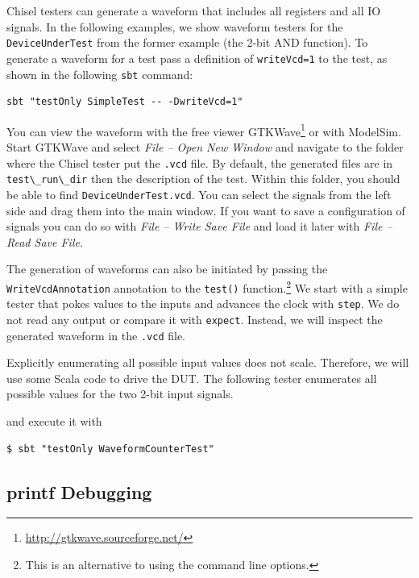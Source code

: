 \documentclass[%
    10pt,
    headinclude, footexclude,
    openright, %
    notitlepage,
    cleardoubleempty,
    headsepline,
    pointlessnumbers,
    bibtotoc, idxtotoc,
    ]{scrbook}
\newcommand{\code}[1]{{\lstinline[basicstyle=\small\ttfamily]{#1}}}
\newcommand{\myref}[2]{\href{#1}{#2}}
\renewcommand{\myref}[2]{{#2}{\footnote{\url{#1}}}}
\begin{document}
\noindent Chisel testers can generate a waveform that includes all registers and all
IO signals. In the following examples, we show waveform testers for the
\code{DeviceUnderTest} from the former example (the 2-bit AND function).
To generate a waveform for a test pass a definition of \code{writeVcd=1} to
the test, as shown in the following \code{sbt} command:

\begin{verbatim}
sbt "testOnly SimpleTest -- -DwriteVcd=1"
\end{verbatim}

You can view the waveform with the free viewer
\myref{http://gtkwave.sourceforge.net/}{GTKWave} or with ModelSim.
Start GTKWave and select \emph{File -- Open New Window} and navigate to the
folder where the Chisel tester put the \code{.vcd} file. By default, the generated files
are in \code{test\_run\_dir} then the description of the test. %
Within this folder, you should be able to find \code{DeviceUnderTest.vcd}.
You can select the signals from the left side and drag them into the main window.
If you want to save a configuration of signals you can do so with \emph{File -- Write Save File}
and load it later with \emph{File -- Read Save File}.

The generation of waveforms can also be initiated by passing the \code{WriteVcdAnnotation}
annotation to the \code{test()} function.\footnote{This is an alternative to
using the command line options.}
We start with a simple tester that pokes values to the inputs and advances
the clock with \code{step}. We do not read any output or compare it with \code{expect}.
Instead, we will inspect the generated waveform in the \code{.vcd} file.






Explicitly enumerating all possible input values does not scale. Therefore, we will use
some Scala code to drive the DUT. The following tester enumerates all possible values for
the two 2-bit input signals.


\noindent and execute it with

\begin{verbatim}
$ sbt "testOnly WaveformCounterTest"
\end{verbatim}

\subsection{printf Debugging}
\end{document}
